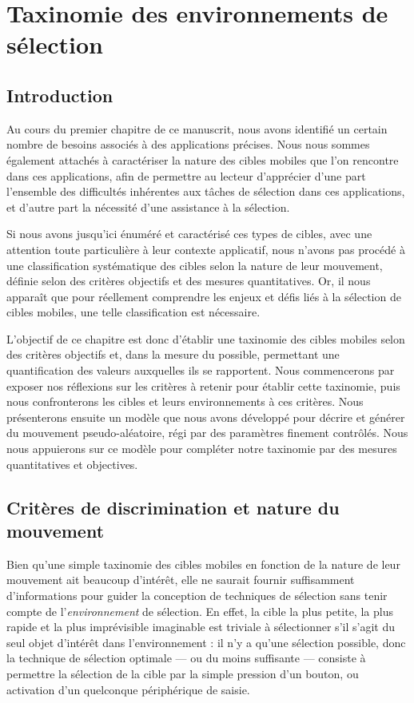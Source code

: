 
\chapter[Taxinomie des environnements de sélection]{Taxinomie des environnements de sélection}
\minitoc
\label{chap3}
\cleardoublepage

\section{Introduction}
	Au cours du premier chapitre de ce manuscrit, nous avons identifié un certain nombre de besoins associés à des applications précises. Nous nous sommes également attachés à caractériser la nature des cibles mobiles que l'on rencontre dans ces applications, afin de permettre au lecteur d'apprécier d'une part l'ensemble des difficultés inhérentes aux tâches de sélection dans ces applications, et d'autre part la nécessité d'une assistance à la sélection.
	
	Si nous avons jusqu'ici énuméré et caractérisé ces types de cibles, avec une attention toute particulière à leur contexte applicatif, nous n'avons pas procédé à une classification systématique des cibles selon la nature de leur mouvement, définie selon des critères objectifs et des mesures quantitatives. Or, il nous apparaît que pour réellement comprendre les enjeux et défis liés à la sélection de cibles mobiles, une telle classification est nécessaire.
	
	L'objectif de ce chapitre est donc d'établir une taxinomie des cibles mobiles selon des critères objectifs et, dans la mesure du possible, permettant une quantification des valeurs auxquelles ils se rapportent. Nous commencerons par exposer nos réflexions sur les critères à retenir pour établir cette taxinomie, puis nous confronterons les cibles et leurs environnements à ces critères. Nous présenterons ensuite un modèle que nous avons développé pour décrire et générer du mouvement pseudo-aléatoire, régi par des paramètres finement contrôlés. Nous nous appuierons sur ce modèle pour compléter notre taxinomie par des mesures quantitatives et objectives.
	
	
	\section{Critères de discrimination et nature du mouvement}
	Bien qu'une \og simple \fg{} taxinomie des cibles mobiles en fonction de la nature de leur mouvement ait beaucoup d'intérêt, elle ne saurait fournir suffisamment d'informations pour guider la conception de techniques de sélection sans tenir compte de l'\emph{environnement} de sélection. En effet, la cible la plus petite, la plus rapide et la plus imprévisible imaginable est triviale à sélectionner s'il s'agit du seul objet d'intérêt dans l'environnement : il n'y a qu'une sélection possible, donc la technique de sélection optimale --- ou du moins suffisante --- consiste à permettre la sélection de la cible par la simple pression d'un bouton, ou activation d'un quelconque périphérique de saisie.
	
